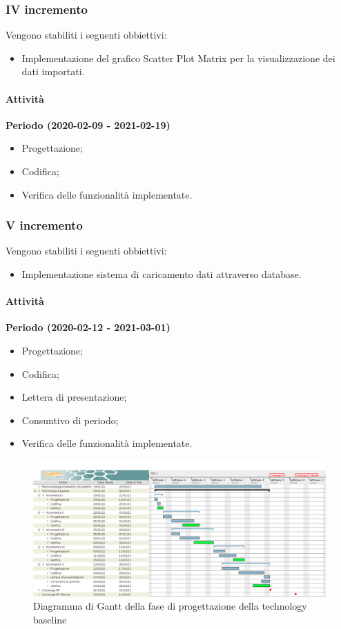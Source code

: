 \documentclass[../piano_di_progetto.tex]{subfiles}
\begin{document}
\subsubsection{IV incremento}
Vengono stabiliti i seguenti obbiettivi:
\begin{itemize}
    \item Implementazione del grafico Scatter Plot Matrix per la visualizzazione dei dati importati.
\end{itemize}
\paragraph{Attività}
\noindent\textbf{Periodo (2020-02-09 - 2021-02-19)}
\begin{itemize}
    \item Progettazione;
    \item Codifica;
    \item Verifica delle funzionalità implementate.
\end{itemize}

\subsubsection{V incremento}
Vengono stabiliti i seguenti obbiettivi:
\begin{itemize}
    \item Implementazione sistema di caricamento dati attraverso database.
\end{itemize}
\paragraph{Attività}
\noindent\textbf{Periodo (2020-02-12 - 2021-03-01)}
\begin{itemize}
    \item Progettazione;
    \item Codifica;
    \item Lettera di presentazione;
    \item Consuntivo di periodo;
    \item Verifica delle funzionalità implementate.
\end{itemize}


\begin{figure}[H]
    \centering
    \includegraphics[width=18cm]{src/img/gantt/4_3_tech_baseline.png}
    \caption{Diagramma di Gantt della fase di progettazione della technology baseline}
\end{figure}
\end{document}
